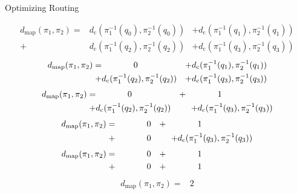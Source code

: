 \documentclass{beamer}
\begin{document}
\begin{frame}{Optimizing Routing}
\begin{overprint}
	\centering
	\begin{align*}
		d_{\text{map}}(\pi_1, \pi_2) =& d_{\text{c}}(\pi^{-1}_1(q_0),\pi^{-1}_2(q_0)) &+ d_{\text{c}}(\pi^{-1}_1(q_1),\pi^{-1}_2(q_1))\\
		+& d_{\text{c}}(\pi^{-1}_1(q_2),\pi^{-1}_2(q_2)) &+ d_{\text{c}}(\pi^{-1}_1(q_3),\pi^{-1}_2(q_3))
	\end{align*}
	\onslide<6>\centering
	\begin{align*}
		d_{\text{map}}(\pi_1, \pi_2) =& \text{\phantom{XXXXX}}0 &+ d_{\text{c}}(\pi^{-1}_1(q_1), \pi^{-1}_2(q_1))\\
		+& d_{\text{c}}(\pi^{-1}_1(q_2),\pi^{-1}_2(q_2)) &+ d_{\text{c}}(\pi^{-1}_1(q_3), \pi^{-1}_2(q_3))
	\end{align*}
	\onslide<7>\centering
	\begin{align*}
		d_{\text{map}}(\pi_1, \pi_2) =& \text{\phantom{XXXXX}}0 &+ \text{\phantom{XXXXX}}1\text{\phantom{XXXXXXXX}}&\\
		+& d_{\text{c}}(\pi^{-1}_1(q_2),\pi^{-1}_2(q_2)) &+ d_{\text{c}}(\pi^{-1}_1(q_3),\pi^{-1}_2(q_3))&
	\end{align*}
	\onslide<8>\centering
	\begin{align*}
		d_{\text{map}}(\pi_1, \pi_2) =& \text{\phantom{XXXXX}}0 &+ \text{\phantom{XXXXX}}1\text{\phantom{XXXXXXXX}}&\\
		+& \text{\phantom{XXXXX}}0 &+ d_{\text{c}}(\pi^{-1}_1(q_3),\pi^{-1}_2(q_3))&
	\end{align*}
	\onslide<9>\centering
	\begin{align*}
		d_{\text{map}}(\pi_1, \pi_2) =& \text{\phantom{XXXXX}}0 &+ \text{\phantom{XXXXX}}1\text{\phantom{XXXXXXXX}}&\\
		+& \text{\phantom{XXXXX}}0 &+ \text{\phantom{XXXXX}}1\text{\phantom{XXXXXXXX}}&
	\end{align*}
	\onslide<10->\centering
	\begin{align*}
		d_{\text{map}}(\pi_1, \pi_2) =& 2
	\end{align*}
\end{overprint}
\end{frame}
\end{document}
